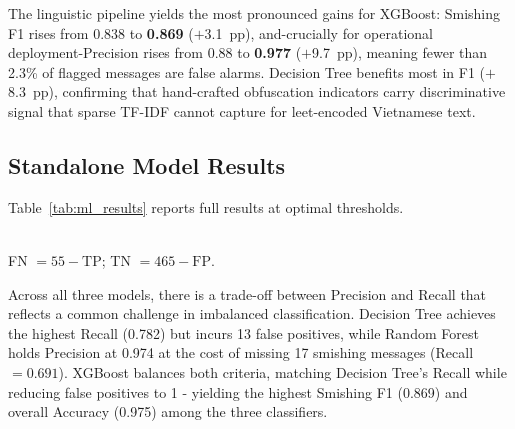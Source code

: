 \documentclass[conference]{IEEEtran}
\begin{document}
The linguistic pipeline yields the most pronounced gains for XGBoost:
Smishing F1 rises from 0.838 to \textbf{0.869} ($+$3.1~pp), and-crucially
for operational deployment-Precision rises from 0.88 to \textbf{0.977}
($+$9.7~pp), meaning fewer than 2.3\% of flagged messages are false alarms.
Decision Tree benefits most in F1 ($+$8.3~pp), confirming that hand-crafted
obfuscation indicators carry discriminative signal that sparse TF-IDF cannot
capture for leet-encoded Vietnamese text.
 
\subsection{Standalone Model Results}
\label{subsec:analysis}
 
Table~\ref{tab:ml_results} reports full results at optimal thresholds.
 
\begin{table}[htbp]
  \caption{Smishing-Class Metrics at Optimal Threshold
           (4-Layer Linguistic Features; test set $n{=}520$)}
  \label{tab:ml_results}
  \centering
  \\[4pt]
  {\small FN $= 55 - \text{TP}$; TN $= 465 - \text{FP}$.}
\end{table}

Across all three models, there is a trade-off between Precision and Recall
that reflects a common challenge in imbalanced classification. Decision Tree
achieves the highest Recall (0.782) but incurs 13 false positives, while
Random Forest holds Precision at 0.974 at the cost of missing 17 smishing
messages (Recall $= 0.691$). XGBoost balances both criteria, matching
Decision Tree's Recall while reducing false positives to 1 - yielding the
highest Smishing F1 (0.869) and overall Accuracy (0.975) among the
three classifiers.
 
\end{document}
